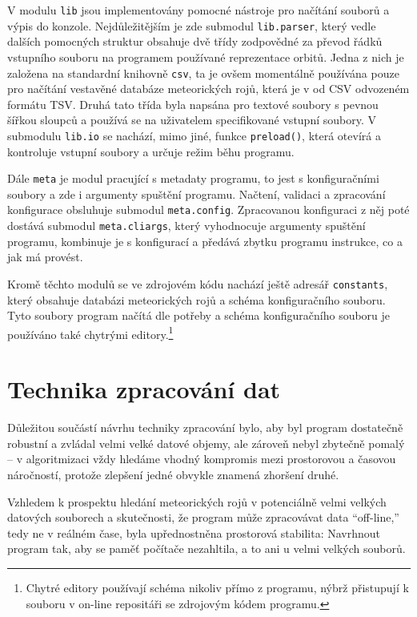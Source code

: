V modulu \texttt{lib} jsou implementovány pomocné nástroje pro načítání souborů a výpis do konzole. Nejdůležitějším je zde submodul \texttt{lib.parser}, který vedle dalších pomocných struktur obsahuje dvě třídy zodpovědné za převod řádků vstupního souboru na programem používané reprezentace orbitů. Jedna z nich je založena na standardní knihovně \texttt{csv}, ta je ovšem momentálně používána pouze pro načítání vestavěné databáze meteorických rojů, která je v od CSV odvozeném formátu TSV. Druhá tato třída byla napsána pro textové soubory s pevnou šířkou sloupců a používá se na uživatelem specifikované vstupní soubory. V submodulu \texttt{lib.io} se nachází, mimo jiné, funkce \texttt{preload()}, která otevírá a kontroluje vstupní soubory a určuje režim běhu programu.

Dále \texttt{meta} je modul pracující s metadaty programu, to jest s konfiguračními soubory a zde i argumenty spuštění programu. Načtení, validaci a zpracování konfigurace obsluhuje submodul \texttt{meta.config}. Zpracovanou konfiguraci z něj poté dostává submodul \texttt{meta.cliargs}, který vyhodnocuje argumenty spuštění programu, kombinuje je s konfigurací a předává zbytku programu instrukce, co a jak má provést.

\smallskip

Kromě těchto modulů se ve zdrojovém kódu nachází ještě adresář \texttt{constants}, který obsahuje databázi meteorických rojů a schéma konfiguračního souboru. Tyto soubory program načítá dle potřeby a schéma konfiguračního souboru je používáno také chytrými editory.\footnote{Chytré editory používají schéma nikoliv přímo z programu, nýbrž přistupují k souboru v on-line repositáři se zdrojovým kódem programu.}

\section{Technika zpracování dat}%
Důležitou součástí návrhu techniky zpracování bylo, aby byl program dostatečně robustní a zvládal velmi velké datové objemy, ale zároveň nebyl zbytečně pomalý -- v algoritmizaci vždy hledáme vhodný kompromis mezi prostorovou a časovou náročností, protože zlepšení jedné obvykle znamená zhoršení druhé.

Vzhledem k prospektu hledání meteorických rojů v potenciálně velmi velkých datových souborech a skutečnosti, že program může zpracovávat data "`off-line,"' tedy ne v reálném čase, byla upřednostněna prostorová stabilita: Navrhnout program tak, aby se paměť počítače nezahltila, a to ani u velmi velkých souborů.

